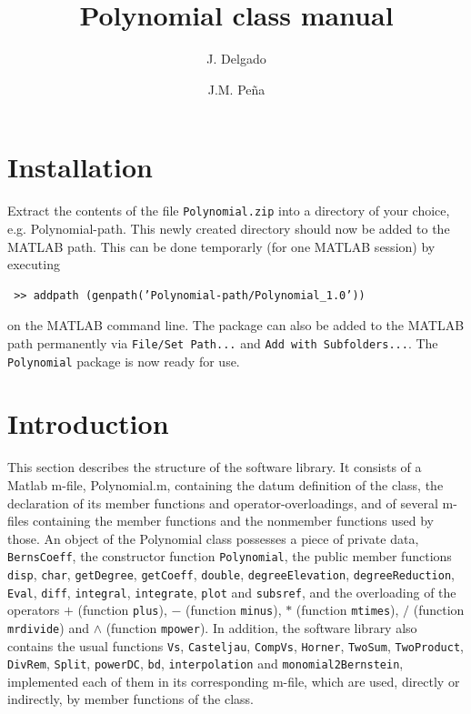 \documentclass[a4paper,10pt]{report}
\title{Polynomial class manual}
\author{J. Delgado \and J.M. Pe\~na}
\begin{document}
\maketitle


\section{Installation}

Extract the contents of the file \verb"Polynomial.zip" into a directory of your choice, e.g. Polynomial-path.
This newly created directory should now be added to the MATLAB path. This can be done temporarly (for 
one MATLAB session) by executing
\begin{verbatim}
 >> addpath (genpath(’Polynomial-path/Polynomial_1.0’))
\end{verbatim}
on the MATLAB command line. The package can also be added to
the MATLAB path permanently via \verb"File/Set Path..." and \verb"Add with Subfolders...". The \verb"Polynomial" package
is now ready for use.

\section{Introduction}

This section describes the structure of the software library. It consists of a Matlab m-file, Polynomial.m, containing the datum definition of the class, 
the declaration of its member functions and operator-overloadings, and of several m-files containing the member functions and the nonmember functions 
used by those. An object of the Polynomial class possesses a piece of private data, \verb"BernsCoeff", the constructor
function \verb"Polynomial", the public member functions \verb"disp", \verb"char", \verb"getDegree", \verb"getCoeff", \verb"double", 
\verb"degreeElevation", \verb"degreeReduction", \verb"Eval", \verb"diff", \verb"integral", \verb"integrate", \verb"plot" and
\verb"subsref", and the overloading
of the operators $+$ (function \verb"plus"), $-$ (function \verb"minus"), $*$ (function \verb"mtimes"), $/$ (function \verb"mrdivide")  
and $\wedge$ (function \verb"mpower").
In addition, the software library also contains the usual functions \verb"Vs", \verb"Casteljau", \verb"CompVs", \verb"Horner",
\verb"TwoSum",  \verb"TwoProduct", \verb"DivRem", \verb"Split", \verb"powerDC", \verb"bd", \verb"interpolation" and \verb"monomial2Bernstein",
implemented each of them in its corresponding m-file, which are used, directly or indirectly, by member functions of the class.
\end{document}
